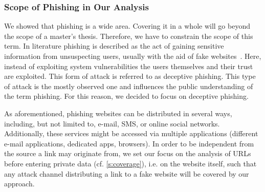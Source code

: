 \subsubsection{Scope of Phishing in Our Analysis}
\label{s:scope}
We showed that phishing is a wide area. 
Covering it in a whole will go beyond the scope of a master's thesis. 
Therefore, we have to constrain the scope of this term.
 In literature phishing is described as the act of gaining sensitive information from unsuspecting users, usually with the aid of fake websites~\cite{sheng2007antiphishingphil, antiphishingtrendreport2013, kasperskyreport2013}.
Here, instead of exploiting system vulnerabilities the users themselves and their trust are exploited.
This form of attack is referred to as deceptive phishing.
This type of attack is the mostly observed one and influences the public understanding of the term phishing.
 For this reason, we decided to focus on deceptive phishing.
 
 As aforementioned, phishing websites can be distributed in several ways, including, but not limited to, e-mail, SMS, or online social networks.
 Additionally, these services might be accessed via multiple applications (different e-mail applications, dedicated apps, browsers).
 In order to be independent from the source a link may originate from, we set our focus on the analysis of URLs before entering private data (cf. \autoref{s:coverage}), i.e. on the website itself, such that any attack channel distributing a link to a fake website will be covered by our approach.
 
